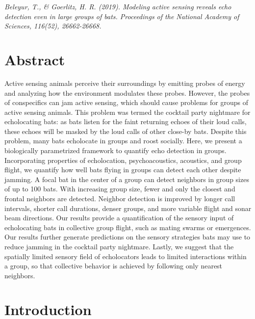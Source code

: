 \documentclass[
]{book}
\begin{document}
\emph{Beleyur, T., \& Goerlitz, H. R. (2019). Modeling active sensing reveals echo detection even in large groups of bats. Proceedings of the National Academy of Sciences, 116(52), 26662-26668.}

\newpage

\hypertarget{cpn_abstract}{%
\section*{Abstract}\label{cpn_abstract}}

Active sensing animals perceive their surroundings by emitting probes of energy and analyzing how the environment modulates these probes. However, the probes of conspecifics can jam active sensing, which should cause problems for groups of active sensing animals. This problem was termed the cocktail party nightmare for echolocating bats: as bats listen for the faint returning echoes of their loud calls, these echoes will be masked by the loud calls of other close-by bats. Despite this problem, many bats echolocate in groups and roost socially. Here, we present a biologically parametrized framework to quantify echo detection in groups. Incorporating properties of echolocation, psychoacoustics, acoustics, and group flight, we quantify how well bats flying in groups can detect each other despite jamming. A focal bat in the center of a group can detect neighbors in group sizes of up to 100 bats. With increasing group size, fewer and only the closest and frontal neighbors are detected. Neighbor detection is improved by longer call intervals, shorter call durations, denser groups, and more variable flight and sonar beam directions. Our results provide a quantification of the sensory input of echolocating bats in collective group flight, such as mating swarms or emergences. Our results further generate predictions on the sensory strategies bats may use to reduce jamming in the cocktail party nightmare. Lastly, we suggest that the spatially limited sensory field of echolocators leads to limited interactions within a group, so that collective behavior is achieved by following only nearest neighbors.

\newpage

\hypertarget{introduction}{%
\section{Introduction}\label{introduction}}
\end{document}

